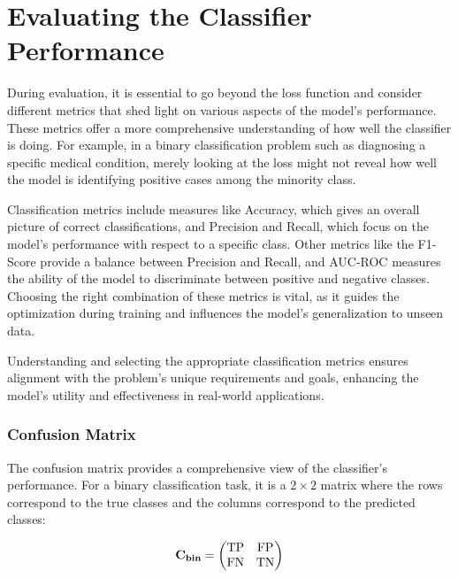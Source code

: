 \section{Evaluating the Classifier Performance}
\label{sec:evaluation}

During evaluation, it is essential to go beyond the loss function and consider different metrics that shed
light on various aspects of the model's performance. These metrics offer a more comprehensive understanding of how well
the classifier is doing. For example, in a binary classification problem such as diagnosing a specific medical
condition, merely looking at the loss might not reveal how well the model is identifying positive cases among the
minority class.

Classification metrics include measures like Accuracy, which gives an overall picture of correct classifications, and
Precision and Recall, which focus on the model's performance with respect to a specific class. Other metrics like the
F1-Score provide a balance between Precision and Recall, and AUC-ROC measures the ability of the model to discriminate
between positive and negative classes. Choosing the right combination of these metrics is vital, as it guides the
optimization during training and influences the model's generalization to unseen data.

Understanding and selecting the appropriate classification metrics ensures alignment with the problem's unique
requirements and goals, enhancing the model's utility and effectiveness in real-world applications.


\subsubsection{Confusion Matrix}
\label{sec:weihted-cm}

The confusion matrix provides a comprehensive view of the classifier's performance. For a binary classification task, it
is a $2\times2$ matrix where the rows correspond to the true classes and the columns correspond to the predicted classes:

\begin{equation}
    \mathbf{C}_{\textbf{bin}} = \begin{pmatrix}
        \text{TP} & \text{FP} \\
        \text{FN} & \text{TN} \\
    \end{pmatrix}
\end{equation}

